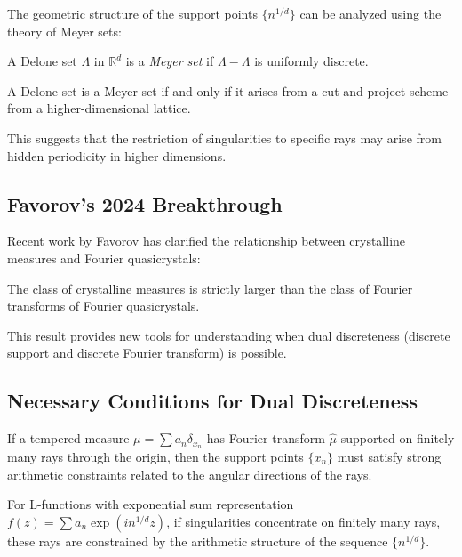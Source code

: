 The geometric structure of the support points $\{n^{1/d}\}$ can be analyzed using the theory of Meyer sets:

\begin{definition}
A Delone set $\Lambda$ in $\mathbb{R}^d$ is a \emph{Meyer set} if $\Lambda - \Lambda$ is uniformly discrete.
\end{definition}

\begin{theorem}
A Delone set is a Meyer set if and only if it arises from a cut-and-project scheme from a higher-dimensional lattice.
\end{theorem}

This suggests that the restriction of singularities to specific rays may arise from hidden periodicity in higher dimensions.

\subsection{Favorov's 2024 Breakthrough}

Recent work by Favorov has clarified the relationship between crystalline measures and Fourier quasicrystals:

\begin{theorem}
The class of crystalline measures is strictly larger than the class of Fourier transforms of Fourier quasicrystals.
\end{theorem}

This result provides new tools for understanding when dual discreteness (discrete support and discrete Fourier transform) is possible.

\subsection{Necessary Conditions for Dual Discreteness}

\begin{theorem}
If a tempered measure $\mu = \sum a_n \delta_{x_n}$ has Fourier transform $\hat{\mu}$ supported on finitely many rays through the origin, then the support points $\{x_n\}$ must satisfy strong arithmetic constraints related to the angular directions of the rays.
\end{theorem}

\begin{corollary}
For L-functions with exponential sum representation $f(z) = \sum a_n \exp(i n^{1/d} z)$, if singularities concentrate on finitely many rays, these rays are constrained by the arithmetic structure of the sequence $\{n^{1/d}\}$.
\end{corollary}

